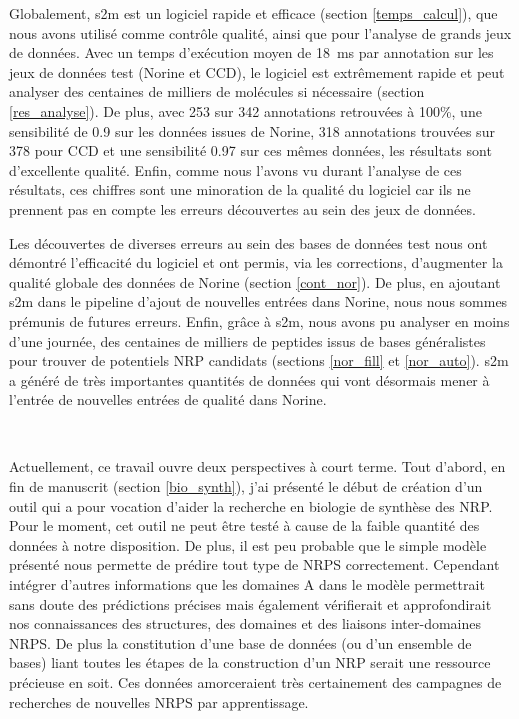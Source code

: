 Globalement, s2m est un logiciel rapide et efficace (section \ref{temps_calcul}), que nous avons utilisé comme contrôle qualité, ainsi que pour l'analyse de grands jeux de données.
Avec un temps d'exécution moyen de 18~ms par annotation sur les jeux de données test (Norine et CCD), le logiciel est extrêmement rapide et peut analyser des centaines de milliers de molécules si nécessaire (section \ref{res_analyse}).
De plus, avec 253 sur 342 annotations retrouvées à 100\%, une sensibilité de 0.9 sur les données issues de Norine, 318 annotations trouvées sur 378 pour CCD et une sensibilité 0.97 sur ces mêmes données, les résultats sont d'excellente qualité.
Enfin, comme nous l'avons vu durant l'analyse de ces résultats, ces chiffres sont une minoration de la qualité du logiciel car ils ne prennent pas en compte les erreurs découvertes au sein des jeux de données.

Les découvertes de diverses erreurs au sein des bases de données test nous ont démontré l'efficacité du logiciel et ont permis, via les corrections, d'augmenter la qualité globale des données de Norine (section \ref{cont_nor}).
De plus, en ajoutant s2m dans le pipeline d'ajout de nouvelles entrées dans Norine, nous nous sommes prémunis de futures erreurs.
Enfin, grâce à s2m, nous avons pu analyser en moins d'une journée, des centaines de milliers de peptides issus de bases généralistes pour trouver de potentiels NRP candidats (sections \ref{nor_fill} et \ref{nor_auto}).
s2m a généré de très importantes quantités de données qui vont désormais mener à l'entrée de nouvelles entrées de qualité dans Norine.


~~


Actuellement, ce travail ouvre deux perspectives à court terme.
Tout d'abord, en fin de manuscrit (section \ref{bio_synth}), j'ai présenté le début de création d'un outil qui a pour vocation d'aider la recherche en biologie de synthèse des NRP.
Pour le moment, cet outil ne peut être testé à cause de la faible quantité des données à notre disposition.
De plus, il est peu probable que le simple modèle présenté nous permette de prédire tout type de NRPS correctement.
Cependant intégrer d'autres informations que les domaines A dans le modèle permettrait sans doute des prédictions précises mais également vérifierait et approfondirait nos connaissances des structures, des domaines et des liaisons inter-domaines NRPS.
De plus la constitution d'une base de données (ou d'un ensemble de bases) liant toutes les étapes de la construction d'un NRP serait une ressource précieuse en soit.
Ces données amorceraient très certainement des campagnes de recherches de nouvelles NRPS par apprentissage.

